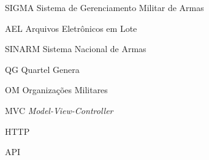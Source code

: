\begin{siglas}
  \item[SIGMA] Sistema de Gerenciamento Militar de Armas
  \item[AEL] Arquivos Eletrônicos em Lote 
  \item[SINARM] Sistema Nacional de Armas 
  \item[QG] Quartel Genera
  \item[OM] Organizações Militares
  \item[MVC] \textit{Model-View-Controller}
  \item[HTTP] 
  \item[API] 
  
\end{siglas}